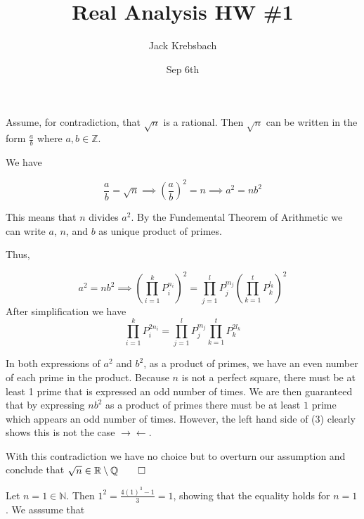 \documentclass{report}
\title{Real Analysis HW \#1}
\author{Jack Krebsbach }
\date{Sep 6th}
\begin{document}
\maketitle

\sol Assume, for contradiction, that $\sqrt{n}$ is a rational. Then $\sqrt{n}$ can be written in the form $\frac{a}{b}$ where $a,b \in \mathbb{Z}$.

We have 


\begin{equation}
  \frac{a}{b} = \sqrt{n} \implies
  \left(\frac{a}{b}\right)^{2} = n \implies a^2 = n b^2
\end{equation}


This means that $n$ divides $a^{2}$. 
By the Fundemental Theorem of Arithmetic we can write $a$, $n$, and $b$ as  unique product of primes. 

Thus, 

\begin{equation}
 a^2 = n b^2 \implies
 \left(\prod^{k}_{i = 1} P_{i}^{n_i}\right)^2  = \prod_{j = 1}^{l} P_{j}^{m_j}\left(\prod^{t}_{k = 1} P_{k}^{l_k}\right)^2 
\end{equation}
After simplification we have
\begin{equation}
     \prod^{k}_{i = 1} P_{i}^{2n_i}  = \prod_{j = 1}^{l} P_{j}^{m_j}\prod^{t}_{k = 1} P_{k}^{2l_k}
\end{equation}


In both expressions of $a^2$ and $b^2$, as a product of primes, we have an even number of each prime in the product. Because $n$ is not a perfect square, there must be at least 1 prime that is expressed an odd number of times. We are then guaranteed that by expressing $nb^2$ as a product of primes there must be at least $1$ prime which appears an odd number of times. However, the left hand side of (3) clearly shows this is not the case $\rightarrow\!\leftarrow.$

With this contradiction we have no choice but to overturn our assumption and conclude that $\sqrt{n} \in \mathbb{R} \setminus \mathbb{Q} \qed$

\bigskip
{}
\sol

Let $n=1 \in \mathbb{N}$. Then $1^2 =  \frac{4 (1)^{3}-1}{3} = 1$, showing that the equality holds for $n=1$. We asssume that 
\end{document}
